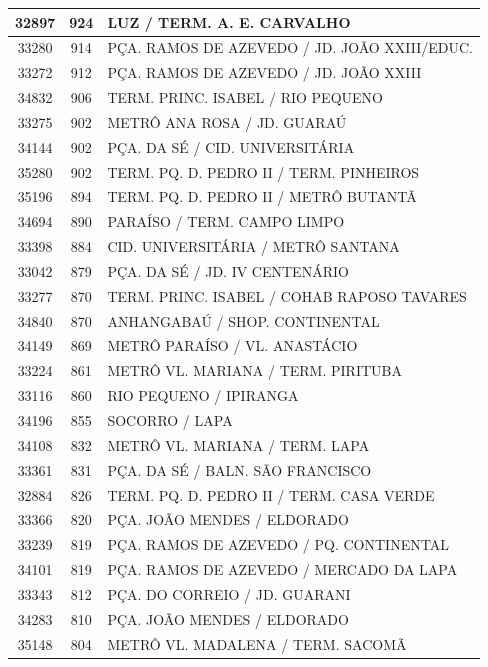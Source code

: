 \documentclass[
	12pt,				%
	oneside,			%
	a4paper,			%
	english,			%
	brazil				%
	]{abntex2ppgsi}
\begin{document}
{{\begin{apendicesenv}
\begin{longtable}{c|c|p{7cm}}
 \hline 
32897 &	924 &	LUZ / TERM. A. E. CARVALHO \\ 
 \hline 
33280 &	914 &	PÇA. RAMOS DE AZEVEDO / JD. JOÃO XXIII/EDUC. \\ 
 \hline 
33272 &	912 &	PÇA. RAMOS DE AZEVEDO / JD. JOÃO XXIII \\ 
 \hline 
34832 &	906 &	TERM. PRINC. ISABEL / RIO PEQUENO \\ 
 \hline 
33275 &	902 &	METRÔ ANA ROSA / JD. GUARAÚ \\ 
 \hline 
34144 &	902 &	PÇA. DA SÉ / CID. UNIVERSITÁRIA \\ 
 \hline 
35280 &	902 &	TERM. PQ. D. PEDRO II / TERM. PINHEIROS \\ 
 \hline 
35196 &	894 &	TERM. PQ. D. PEDRO II / METRÔ BUTANTÃ \\ 
 \hline 
34694 &	890 &	PARAÍSO / TERM. CAMPO LIMPO \\ 
 \hline 
33398 &	884 &	CID. UNIVERSITÁRIA / METRÔ SANTANA \\ 
 \hline 
33042 &	879 &	PÇA. DA SÉ / JD. IV CENTENÁRIO \\ 
 \hline 
33277 &	870 &	TERM. PRINC. ISABEL / COHAB RAPOSO TAVARES \\ 
 \hline 
34840 &	870 &	ANHANGABAÚ / SHOP. CONTINENTAL \\ 
 \hline 
34149 &	869 &	METRÔ PARAÍSO / VL. ANASTÁCIO \\ 
 \hline 
33224 &	861 &	METRÔ VL. MARIANA / TERM. PIRITUBA \\ 
 \hline 
33116 &	860 &	RIO PEQUENO / IPIRANGA \\ 
 \hline 
34196 &	855 &	SOCORRO / LAPA \\ 
 \hline 
34108 &	832 &	METRÔ VL. MARIANA / TERM. LAPA \\ 
 \hline 
33361 &	831 &	PÇA. DA SÉ / BALN. SÃO FRANCISCO \\ 
 \hline 
32884 &	826 &	TERM. PQ. D. PEDRO II / TERM. CASA VERDE \\ 
 \hline 
33366 &	820 &	PÇA. JOÃO MENDES / ELDORADO \\ 
 \hline 
33239 &	819 &	PÇA. RAMOS DE AZEVEDO / PQ. CONTINENTAL \\ 
 \hline 
34101 &	819 &	PÇA. RAMOS DE AZEVEDO / MERCADO DA LAPA \\ 
 \hline 
33343 &	812 &	PÇA. DO CORREIO / JD. GUARANI \\ 
 \hline 
34283 &	810 &	PÇA. JOÃO MENDES / ELDORADO \\ 
 \hline 
35148 &	804 &	METRÔ VL. MADALENA / TERM. SACOMÃ \\ 

\end{longtable}
\end{apendicesenv}}}
\end{document}
